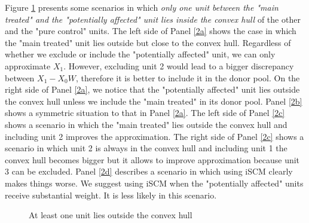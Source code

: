 Figure \ref{convexhull2} presents some scenarios in which \textit{only one unit between the "main treated" and the "potentially affected" unit lies inside the convex hull} of the other and the "pure control" units.
The left side of Panel \ref{2a} shows the case in which the "main treated" unit lies outside but close to the convex hull. Regardless of whether we exclude or include the "potentially affected" unit, we can only approximate  $X_1$.  However, excluding unit 2 would lead to a bigger discrepancy between $X_1-X_0W$, therefore it is better to include it in the donor pool. On the right side of Panel \ref{2a}, we notice that the "potentially affected" unit lies outside the convex hull unless we include the "main treated" in its donor pool. 
Panel \ref{2b} shows a symmetric situation to that in Panel \ref{2a}. 
The left side of Panel \ref{2c} shows a scenario in which the "main treated" lies outside the convex hull and including unit 2 improves the approximation. The right side of Panel \ref{2c} shows a scenario in which unit 2 is always in the convex hull and including unit 1 the convex hull becomes bigger but it allows to improve approximation because unit 3 can be excluded.
Panel \ref{2d} describes a scenario in which using iSCM clearly makes things worse. We suggest using iSCM when the "potentially affected" units receive substantial weight. It is less likely in this scenario. 

\begin{figure}[H]
\centering
{}
\quad
{}
\quad
{}
\quad
{}
\caption{At least one unit lies outside the convex hull}
\label{convexhull2}
\end{figure}
